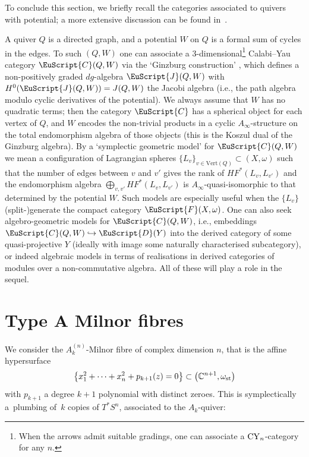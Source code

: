 \documentclass[pdftex]{sigma}
\def\scrJ{\EuScript{J}}
\newcommand{\scrF}{\EuScript{F}}
\newcommand{\scrC}{\EuScript{C}}
\def\bC{\mathbb{C}}
\def\scrD{\EuScript{D}}
\theoremstyle{definition}
\numberwithin{equation}{section}
\begin{document}
To conclude this section, we briefly recall the categories associated to quivers with potential; a more extensive discussion can be found in~\cite{Smith:quiver}.

A quiver $Q$ is a directed graph, and a potential $W$ on $Q$ is a formal sum of cycles in the edges. To such $(Q,W)$ one can associate a 3-dimensional\footnote{When the arrows admit suitable gradings, one can associate a ${\rm CY}_n$-category for any $n$.} Calabi--Yau category $\scrC(Q,W)$ via the `Ginzburg construction' \cite{Ginzburg}, which defines a non-positively graded $dg$-algebra $\scrJ(Q,W)$ with $H^0(\scrJ(Q,W)) = J(Q,W)$ the Jacobi algebra (i.e., the path algebra modulo cyclic derivatives of the potential).
We always assume that $W$ has no quadratic terms; then the category $\scrC$ has a spherical object for each vertex of $Q$, and $W$ encodes the non-trivial products in a cyclic $A_{\infty}$-structure on the total endomorphism algebra of those objects (this is the Koszul dual of the Ginzburg algebra). By a `symplectic geometric model' for $\scrC(Q,W)$ we mean a configuration of Lagrangian spheres $\{L_v\}_{v \in \mathrm{Vert}(Q)} \subset (X,\omega)$ such that the number of edges between $v$ and $v'$ gives the rank of $HF^*(L_v,L_{v'})$ and the endomorphism algebra $\bigoplus_{v,v'} HF^*(L_v,L_{v'})$ is $A_{\infty}$-quasi-isomorphic to that determined by the potential $W$. Such models are especially useful when the $\{L_v\}$ (split-)generate the compact category $\scrF(X,\omega)$. One can also seek algebro-geometric models for $\scrC(Q,W)$, i.e., embeddings $\scrC(Q,W) \hookrightarrow \scrD(Y)$ into the derived category of some quasi-projective $Y$ (ideally with image some naturally characterised subcategory), or indeed algebraic models in terms of realisations in derived categories of modules over a non-commutative algebra. All of these will play a role in the sequel.

\section[Type A Milnor fibres]{Type $\boldsymbol{A}$ Milnor fibres}
\label{sec:type-A-Milnor-fibres}

We consider the $A^{(n)}_k$-Milnor fibre of complex dimension $n$, that is the affine hypersurface
\begin{equation} \label{eqn:type A}
 \bigl\{ x_1^2+\dots +x_n^2 + p_{k+1}(z) = 0 \bigr\} \subset \bigl(\bC^{n+1}, \omega_{\rm st}\bigr)
\end{equation}
with $p_{k+1}$ a degree $k+1$ polynomial with distinct zeroes. This is symplectically a~plumbing of~$k$ copies of $T^*S^n$, associated to the $A_k$-quiver:
\end{document}
